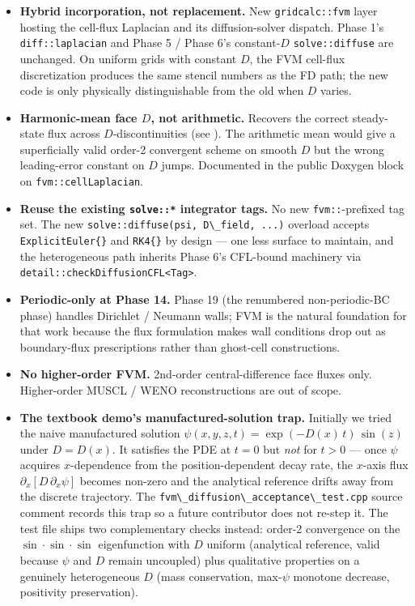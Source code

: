 \begin{itemize}
\item
  \textbf{Hybrid incorporation, not replacement.} New
  \passthrough{\lstinline!gridcalc::fvm!} layer hosting the
  cell-flux Laplacian and its diffusion-solver dispatch. Phase 1's
  \passthrough{\lstinline!diff::laplacian!} and Phase 5 / Phase 6's
  constant-\(D\)
  \passthrough{\lstinline!solve::diffuse!} are unchanged. On uniform
  grids with constant \(D\), the FVM cell-flux discretization
  produces the same stencil numbers as the FD path; the new code
  is only physically distinguishable from the old when
  \(D\) varies.
\item
  \textbf{Harmonic-mean face \(D\), not arithmetic.} Recovers the
  correct steady-state flux across \(D\)-discontinuities (see
  ). The arithmetic mean would give a
  superficially valid order-2 convergent scheme on smooth \(D\) but
  the wrong leading-error constant on \(D\) jumps. Documented in
  the public Doxygen block on
  \passthrough{\lstinline!fvm::cellLaplacian!}.
\item
  \textbf{Reuse the existing \passthrough{\lstinline!solve::*!}
  integrator tags.} No new \passthrough{\lstinline!fvm::!}-prefixed
  tag set. The new
  \passthrough{\lstinline!solve::diffuse(psi, D\_field, ...)!}
  overload accepts
  \passthrough{\lstinline!ExplicitEuler\{\}!} and
  \passthrough{\lstinline!RK4\{\}!} by design --- one less surface
  to maintain, and the heterogeneous path inherits Phase 6's
  CFL-bound machinery via
  \passthrough{\lstinline!detail::checkDiffusionCFL<Tag>!}.
\item
  \textbf{Periodic-only at Phase 14.} Phase 19 (the renumbered
  non-periodic-BC phase) handles Dirichlet / Neumann walls; FVM is
  the natural foundation for that work because the flux
  formulation makes wall conditions drop out as boundary-flux
  prescriptions rather than ghost-cell constructions.
\item
  \textbf{No higher-order FVM.} 2nd-order central-difference face
  fluxes only. Higher-order MUSCL / WENO reconstructions are out
  of scope.
\item
  \textbf{The textbook demo's manufactured-solution trap.}
  Initially we tried the naive manufactured solution
  \(\psi(x, y, z, t) = \exp(-D(x)\,t)\,\sin(z)\) under
  \(D = D(x)\). It satisfies the PDE at \(t = 0\) but \emph{not} for
  \(t > 0\) --- once \(\psi\) acquires \(x\)-dependence from the
  position-dependent decay rate, the \(x\)-axis flux
  \(\partial_x[D\,\partial_x\psi]\) becomes non-zero and the
  analytical reference drifts away from the discrete trajectory.
  The
  \passthrough{\lstinline!fvm\_diffusion\_acceptance\_test.cpp!}
  source comment records this trap so a future contributor does
  not re-step it. The test file ships two complementary checks
  instead: order-2 convergence on the
  \(\sin\!\cdot\!\sin\!\cdot\!\sin\) eigenfunction with \(D\)
  uniform (analytical reference, valid because \(\psi\) and \(D\)
  remain uncoupled) plus qualitative properties on a genuinely
  heterogeneous \(D\) (mass conservation, max-\(\psi\) monotone
  decrease, positivity preservation).
\end{itemize}

